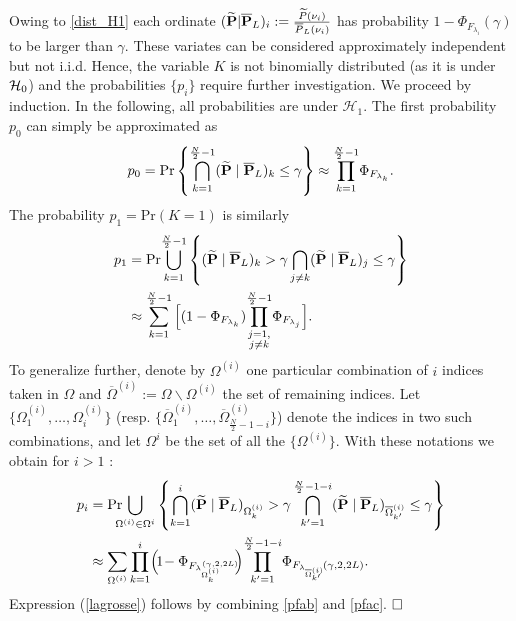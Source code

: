 \documentclass[journal]{IEEEtran}
\begin{document}
\noindent Owing to \eqref{dist_H1} each  ordinate $({\bf \widetilde{\bf P}}|\overline{\bf P}_L)_i:=\frac{\widetilde{P}(\nu_i)}{\overline{ P}_L(\nu_i)}$ has probability $1-\Phi_{F_{\lambda_i}}(\gamma)$ to be larger than $\gamma$. These variates can be considered approximately independent but not i.i.d. Hence, the variable
$K$ is not binomially distributed (as it is under ${\cal{H}}_0$) and the probabilities $\{p_i\}$ require further investigation.  
We proceed by induction.  In the following, all probabilities are under $\mathcal{H}_1$. The first probability  $p_0$ can simply be approximated as 
$$
 \begin{aligned} 
		&p_0=  \textrm{Pr} \left\{\bigcap_{ k=1}^{\frac{N}{2}-1}
	   ({\bf \widetilde{\bf P}}\;|\;\overline{\bf P}_L)_k \leq \gamma   \right\}  \approx \displaystyle{ \prod_{k =1}^{ \frac{N}{2}-1}} \Phi_{F_{\lambda_{k}}}. \\
\end{aligned} 
$$
The probability $p_1=\text{Pr}(K=1)$ is similarly
$$
 \begin{aligned} 
 	p_1 &= \textrm{Pr} {\displaystyle{\bigcup_{k=1}^{\frac{N}{2}-1} }}\left\{  ({\bf \widetilde{\bf P}}\;|\;\overline{\bf P}_L)_k> \gamma      \bigcap_{ j\neq k}
	   ({\bf \widetilde{\bf P}}\;|\;\overline{\bf P}_L)_j \leq \gamma   \right\}   \\
	&\approx \displaystyle{ \sum_{k = 1}^{\frac{N}{2}-1} \Big[  ( 1 -  \Phi_{F_{\lambda_{k}}} ) \displaystyle{ \prod_{\substack{j =1,\\ j \neq k}}^{ \frac{N}{2}-1}} \Phi_{F_{\lambda_{j}}}  \Big] }. \\
\end{aligned} 
$$	
To generalize further, denote by ${\Omega}^{(i)}$ one particular combination of $i$ indices taken in $\Omega$ and $\overline{\Omega}^{(i)}:=\Omega \backslash \Omega^{(i)}$ the set of remaining indices. Let $\{\Omega^{(i)}_1,\hdots , \Omega^{(i)}_i\}$ (resp. $\{\overline{\Omega}^{(i)}_1,\hdots, \overline{\Omega}^{(i)}_{\frac{N}{2}-1-i}\}$) denote the indices in  two such combinations, and let   $\Omega^i$  be the set of all the  $\{{\Omega}^{(i)}\}$. 
With these notations we obtain  for $i>1$ :
\begin{equation}
 \begin{aligned} 
 	p_i &= \textrm{Pr} \!\!\! {\displaystyle{\bigcup_{ {\Omega}^{(i)} \in {\Omega}^{i} } }}
	\left\{   \bigcap_{ k=1}^i	   ({\bf \widetilde{\bf P}}\;|\;\overline{\bf P}_L)_{\Omega^{(i)}_k } > \gamma
	   \bigcap_{ k'=1}^{\frac{N}{2}-1-i}	   ({\bf \widetilde{\bf P}}\;|\;\overline{\bf P}_L)_{\overline{\Omega}^{(i)}_{k'}}  \leq \gamma \right\}   \\	
	&\approx  \displaystyle{  \sum_{\Omega^{(i)} } \prod_{k=1}^{ i  } } \Big(\!1\! - \Phi_{F_{\lambda_{\Omega^{(i)}_k}}\!\!^{\!\!\!\!\!\!\!\!\!(\gamma, 2,2L)}} \!\!\Big) \displaystyle{  \prod_{k'=1}^{ \frac{N}{2}-1-i }}\Phi_{F_{\lambda_{ \overline{\Omega}^{(i)}\!_{\!\!\!\!\!\!k'} }}{(\gamma, 2,2L)} }.
\end{aligned} 
\label{pfac}
\end{equation}	
 Expression  (\ref{lagrosse}) follows by combining \eqref{pfab} and \eqref{pfac}.  ${\hfill\ensuremath{\square}}$
\end{document}

